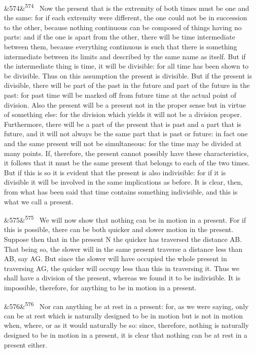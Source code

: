 \documentclass[12pt]{article}
\newcommand{\para}[1][]{\par\noindent\ifx&#1&\else\textsuperscript{\footnotesize #1}~\fi}
\begin{document}
\para[574] Now the present that is the extremity of both times must be one and the same: for if each extremity were different, the one could not be in succession to the other, because nothing continuous can be composed of things having no parts: and if the one is apart from the other, there will be time intermediate between them, because everything continuous is such that there is something intermediate between its limits and described by the same name as itself. But if the intermediate thing is time, it will be divisible: for all time has been shown to be divisible. Thus on this assumption the present is divisible. But if the present is divisible, there will be part of the past in the future and part of the future in the past: for past time will be marked off from future time at the actual point of division. Also the present will be a present not in the proper sense but in virtue of something else: for the division which yields it will not be a division proper. Furthermore, there will be a part of the present that is past and a part that is future, and it will not always be the same part that is past or future: in fact one and the same present will not be simultaneous: for the time may be divided at many points. If, therefore, the present cannot possibly have these characteristics, it follows that it must be the same present that belongs to each of the two times. But if this is so it is evident that the present is also indivisible: for if it is divisible it will be involved in the same implications as before. It is clear, then, from what has been said that time contains something indivisible, and this is what we call a present.

\para[575] We will now show that nothing can be in motion in a present. For if this is possible, there can be both quicker and slower motion in the present. Suppose then that in the present N the quicker has traversed the distance AB. That being so, the slower will in the same present traverse a distance less than AB, say AG. But since the slower will have occupied the whole present in traversing AG, the quicker will occupy less than this in traversing it. Thus we shall have a division of the present, whereas we found it to be indivisible. It is impossible, therefore, for anything to be in motion in a present.

\para[576] Nor can anything be at rest in a present: for, as we were saying, only can be at rest which is naturally designed to be in motion but is not in motion when, where, or as it would naturally be so: since, therefore, nothing is naturally designed to be in motion in a present, it is clear that nothing can be at rest in a present either.
\end{document}
